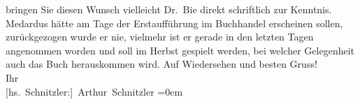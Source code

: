 \begin{ledgroupsized}[t]{13cm}
                    bringen Sie diesen Wunsch vielleicht Dr. Bie
                    direkt schriftlich zur Kenntnis.\pend
           \pstart
           Medardus hätte am Tage der Erstaufführung im
                    Buchhandel erscheinen sollen, zurückgezogen wurde er nie, vielmehr ist er gerade
                    in den letzten Tagen angenommen worden und soll im Herbst gespielt werden, bei
                    welcher Gelegenheit auch das Buch herauskommen wird.\pend
           \pstart
           Auf Wiedersehen und besten Gruss!{\\[\baselineskip]}Ihr{\\[\baselineskip]}\spacefill\mbox{{[}hs. Schnitzler:{]} Arthur Schnitzler}\pend
           \leftskip=0em{}
         
         \endnumbering{}\end{ledgroupsized}  \newcommand{\dateiname}{L01913}\newcommand{\titel}{Arthur Schnitzler an Albert Ehrenstein, 12. 2. 1910}\newcommand{\editorInnen}{Martin Anton Müller und Gerd-Hermann Susen}
      